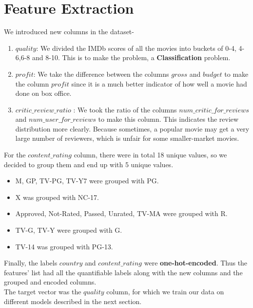 \documentclass[conference]{IEEEtran}
\begin{document}
\section{Feature Extraction}
We introduced new columns in the dataset-
\begin{enumerate}
    \item $quality$: We divided the IMDb scores of all the movies into buckets of 0-4, 4-6,6-8 and 8-10. This is to make the problem, a \textbf{Classification} problem.\\
    
    \item $profit$: We take the difference between the columns $gross$ and $budget$ to make the column $profit$ since it is a much better indicator of how well a movie had done on box office.\\
    
    \item $critic\_review\_ratio$ : We took the ratio of the columns $num\_critic\_for\_reviews$ and $num\_user\_for\_reviews$ to make this column. This indicates the review distribution more clearly. Because sometimes, a popular movie may get a very large number of reviewers, which is unfair for some smaller-market movies.\\
\end{enumerate}
For the $content\_rating$ column, there were in total 18 unique values, so we decided to group them and end up with 5 unique values.
\begin{itemize}
    \item M, GP, TV-PG, TV-Y7 were grouped with PG.
    \item X was grouped with NC-17.
    \item Approved, Not-Rated, Passed, Unrated, TV-MA were grouped with R.
    \item TV-G, TV-Y were grouped with G.
    \item TV-14 was grouped with PG-13.\\
\end{itemize}
Finally, the labels $country$ and $content\_rating$ were \textbf{one-hot-encoded}.
Thus the features' list had all the quantifiable labels along with the new columns and the grouped and encoded columns.\\
The target vector was the $quality$ column, for which we train our data on different models described in the next section.\\
\end{document}
